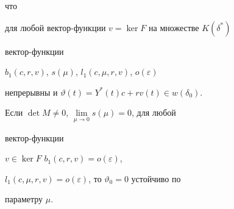 что 


для любой вектор-функции $v=\ker F$ на множестве $K(\delta^*)$ 


вектор-функции 


$b_1(c,r,v)$, $s(\mu)$, $l_1(c,\mu,r,v)$, $o(\varepsilon)$ 


непрерывны и $\vartheta(t)=Y^*(t)c+r v(t)\in w(\delta_0)$. 


 


\begin{thm} 


Если $\det M\ne0$, $\lim\limits_{\mu\to0}s(\mu)=0$, для любой 


вектор-функции 


$v\in\ker F$\; $b_1(c,r,v)=o(\varepsilon)$, 


$l_1(c,\mu,r,v)=o(\varepsilon)$, то $\vartheta_0=0$ устойчиво по 


параметру $\mu$. 


\end{thm} 


 


